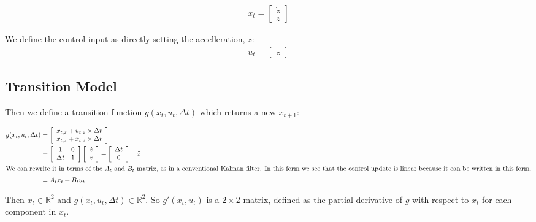 \documentclass{article}
\begin{document}
\begin{align}
  x_t = \left[\begin{array}{c}
      \dot{z}\\
      z
      \end{array}
      \right]
\end{align}

We define the control input as directly setting the accelleration, $\ddot{z}$:
\begin{align}
  u_t = \left[\begin{array}{c} \ddot{z} \end{array}\right]
\end{align}

\subsection{Transition Model}

Then we define a transition function $g(x_t, u_t, \Delta t)$ which returns a new $x_{t+1}$:

\begin{align}
  g(x_t, u_t, \Delta t) &= \left[\begin{array}{c}
      x_{t, \dot{z}} + u_{t,\ddot{z}}\times \Delta t\\ x_{t,z} + x_{t,\dot{z}} \times \Delta t \end{array} \right]\\
      &= \left[\begin{array}{cc}
          1 & 0\\
          \Delta t & 1 
    \end{array}\right]
      \left[\begin{array}{c} \dot{z}\\z\end{array}\right] +
      \left[\begin{array}{cc}
          \Delta t \\ 0
        \end{array}\right]
      \left[\begin{array}{c} \ddot{z} \end{array}\right]\\
      \intertext{We can rewrite it in terms of the $A_t$ and $B_t$ matrix, as in a conventional Kalman filter.  In this form we see that the control update is linear because it can be written in this form.}
      &=A_t x_t + B_t u_t
\end{align}

Then $x_t \in \mathbb{R}^2$ and $g(x_t, u_t, \Delta t) \in
\mathbb{R}^2$.  So $g'(x_t, u_t)$ is a $2\times2$ matrix, defined as
the partial derivative of $g$ with respect to $x_t$ for each component
in $x_t$.
\end{document}
